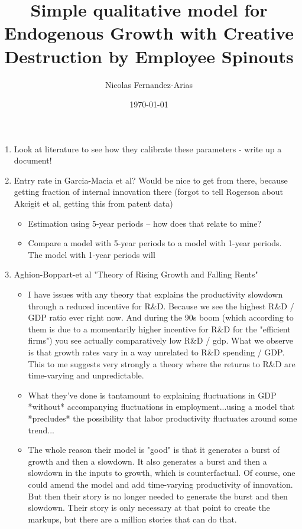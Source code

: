 \documentclass[12pt,english]{article}
\theoremstyle{remark}
\begin{document}
	
\title{Simple qualitative model for Endogenous Growth with Creative Destruction by Employee Spinouts}
\author{Nicolas Fernandez-Arias}
\date{\today}
\maketitle

\begin{enumerate}
	\item Look at literature to see how they calibrate these parameters - write up a document!
	\item Entry rate in Garcia-Macia et al? Would be nice to get from there, because getting fraction of internal innovation there (forgot to tell Rogerson about Akcigit et al, getting this from patent data)
	\begin{itemize}
		\item Estimation using 5-year periods -- how does that relate to mine?
		\item Compare a model with 5-year periods to a model with 1-year periods. The model with 1-year periods will 
	\end{itemize}
	\item Aghion-Boppart-et al "Theory of Rising Growth and Falling Rents"
	\begin{itemize}
		\item I have issues with any theory that explains the productivity slowdown through a reduced incentive for R\&D. Because we see the highest R\&D / GDP ratio ever right now. And during the 90s boom (which according to them is due to a momentarily higher incentive for R\&D for the "efficient firms") you see actually comparatively low R\&D / gdp. What we observe is that growth rates vary in a way unrelated to R\&D spending / GDP. This to me suggests very strongly a theory where the returns to R\&D are time-varying and unpredictable. 
		\item What they've done is tantamount to explaining fluctuations in GDP *without* accompanying fluctuations in employment...using a model that *precludes* the possibility that labor productivity fluctuates around some trend...
		\item The whole reason their model is "good" is that it generates a burst of growth and then a slowdown. It also generates a burst and then a slowdown in the inputs to growth, which is counterfactual. Of course, one could amend the model and add time-varying productivity of innovation. But then their story is no longer needed to generate the burst and then slowdown. Their story is only necessary at that point to create the markups, but there are a million stories that can do that. 

\end{itemize}
\end{enumerate}
\end{document}
